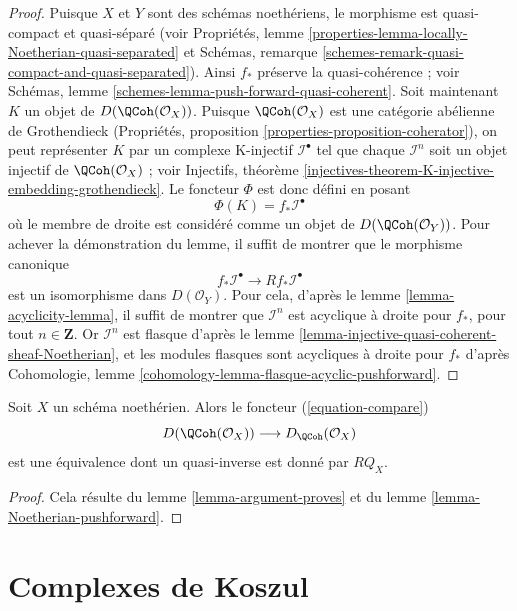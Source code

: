 \begin{proof}
Puisque $X$ et $Y$ sont des schémas noethériens, le morphisme est quasi-compact
et quasi-séparé (voir
Propriétés, lemme \ref{properties-lemma-locally-Noetherian-quasi-separated}
et
Schémas, remarque \ref{schemes-remark-quasi-compact-and-quasi-separated}).
Ainsi $f_*$ préserve la quasi-cohérence ; voir
Schémas, lemme \ref{schemes-lemma-push-forward-quasi-coherent}.
Soit maintenant $K$ un objet de $D(\QCoh(\mathcal{O}_X))$.
Puisque $\QCoh(\mathcal{O}_X)$ est une catégorie abélienne de Grothendieck
(Propriétés, proposition \ref{properties-proposition-coherator}), on peut
représenter $K$ par un complexe K-injectif $\mathcal{I}^\bullet$
tel que chaque $\mathcal{I}^n$ soit un objet injectif de
$\QCoh(\mathcal{O}_X)$ ; voir
Injectifs, théorème
\ref{injectives-theorem-K-injective-embedding-grothendieck}.
Le foncteur $\Phi$ est donc défini en posant
$$
\Phi(K) = f_*\mathcal{I}^\bullet
$$
où le membre de droite est considéré comme un objet de
$D(\QCoh(\mathcal{O}_Y))$. Pour achever la démonstration du lemme,
il suffit de montrer que le morphisme canonique
$$
f_*\mathcal{I}^\bullet \longrightarrow Rf_*\mathcal{I}^\bullet
$$
est un isomorphisme dans $D(\mathcal{O}_Y)$. Pour cela, d'après
le lemme \ref{lemma-acyclicity-lemma},
il suffit de montrer que $\mathcal{I}^n$ est acyclique à droite pour
$f_*$, pour tout $n \in \mathbf{Z}$.
Or $\mathcal{I}^n$ est flasque d'après
le lemme \ref{lemma-injective-quasi-coherent-sheaf-Noetherian},
et les modules flasques sont acycliques à droite pour $f_*$ d'après
Cohomologie, lemme \ref{cohomology-lemma-flasque-acyclic-pushforward}.
\end{proof}

\begin{proposition}
\label{proposition-Noetherian}
Soit $X$ un schéma noethérien. Alors le foncteur (\ref{equation-compare})
$$
D(\QCoh(\mathcal{O}_X))
\longrightarrow
D_\QCoh(\mathcal{O}_X)
$$
est une équivalence dont un quasi-inverse est donné par $RQ_X$.
\end{proposition}

\begin{proof}
Cela résulte du lemme \ref{lemma-argument-proves} et du
lemme \ref{lemma-Noetherian-pushforward}.
\end{proof}






\section{Complexes de Koszul}
\label{section-koszul}

